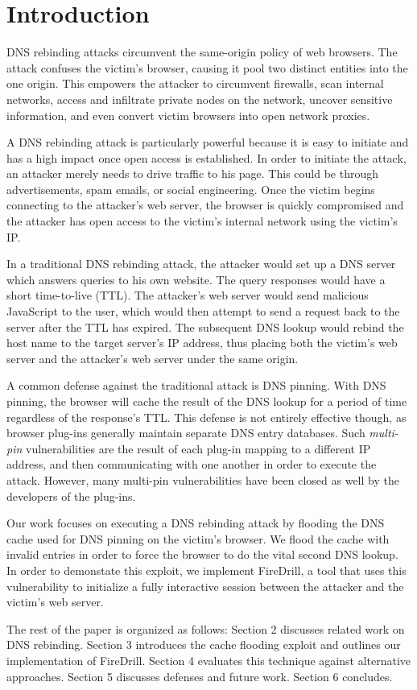 \section{Introduction}
\label{sec:intro}


DNS rebinding attacks circumvent the same-origin policy of web browsers. The attack confuses the victim's browser, causing it pool two distinct entities into the one origin. This empowers the attacker to circumvent firewalls, scan internal networks, access and infiltrate private nodes on the network, uncover sensitive information, and even convert victim browsers into open network proxies.

A DNS rebinding attack is particularly powerful because it is easy to initiate and has a high impact once open access is established. In order to initiate the attack, an attacker merely needs to drive traffic to his page. This could be through advertisements, spam emails, or social engineering. Once the victim begins connecting to the attacker's web server, the browser is quickly compromised and the attacker has open access to the victim's internal network using the victim's IP.

In a traditional DNS rebinding attack, the attacker would set up a DNS server which answers queries to his own website. The query responses would have a short time-to-live (TTL). The attacker's web server would send malicious JavaScript to the user, which would then attempt to send a request back to the server after the TTL has expired. The subsequent DNS lookup would rebind the host name to the target server's IP address, thus placing both the victim's web server and the attacker's web server under the same origin.

A common defense against the traditional attack is DNS pinning. With DNS pinning, the browser will cache the result of the DNS lookup for a period of time regardless of the response's TTL. This defense is not entirely effective though, as browser plug-ins generally maintain separate DNS entry databases. Such \emph{multi-pin} vulnerabilities are the result of each plug-in mapping to a different IP address, and then communicating with one another in order to execute the attack. However, many multi-pin vulnerabilities have been closed as well by the developers of the plug-ins. 

Our work focuses on executing a DNS rebinding attack by flooding the DNS cache used for DNS pinning on the victim's browser. We flood the cache with invalid entries in order to force the browser to do the vital second DNS lookup. In order to demonstate this exploit, we implement FireDrill, a tool that uses this vulnerability to initialize a fully interactive session between the attacker and the victim's web server.

The rest of the paper is organized as follows: Section 2 discusses related work on DNS rebinding. Section 3 introduces the cache flooding exploit and outlines our implementation of FireDrill. Section 4 evaluates this technique against alternative approaches. Section 5 discusses defenses and future work. Section 6 concludes.
